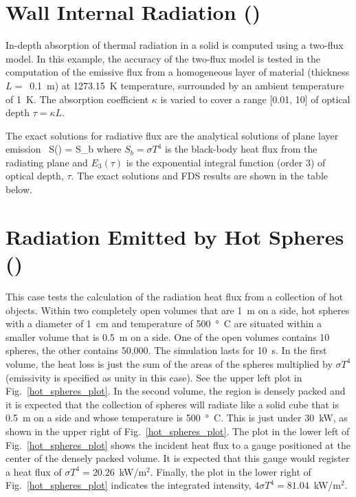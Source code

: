 \documentclass[11pt]{book}
\begin{document}


\section{Wall Internal Radiation (\texorpdfstring{}{wall\_internal\_radiation}) }
\label{wall_internal_radiation}

In-depth absorption of thermal radiation in a solid is computed using a two-flux model.  In this example, the accuracy of the two-flux model is tested in the computation of the emissive flux from a homogeneous layer of material (thickness $L=$~0.1~m) at 1273.15~K temperature, surrounded by an ambient temperature of 1~K. The absorption coefficient $\kappa$ is varied to cover a range [0.01, 10] of optical depth $\tau = \kappa L$.

The exact solutions for radiative flux are the analytical solutions of plane layer emission~\cite{Zeldovich:1}
\be
   S(\tau) = S_b
\ee
where $S_b = \sigma T^4$ is the black-body heat flux from the radiating plane and $E_3(\tau)$ is the exponential integral function (order 3) of optical depth, $\tau$. The exact solutions and FDS results are shown in the table below.




\section{Radiation Emitted by Hot Spheres (\texorpdfstring{}{hot\_spheres}) }
\label{hot_spheres}

This case tests the calculation of the radiation heat flux from a collection of hot objects. Within two completely open volumes that are 1~m on a side, hot spheres with a diameter of 1~cm and temperature of 500~\si{\degree C} are situated within a smaller volume that is 0.5~m on a side. One of the open volumes contains 10 spheres, the other contains 50,000. The simulation lasts for 10~s. In the first volume, the heat loss is just the sum of the areas of the spheres multiplied by $\sigma T^4$ (emissivity is specified as unity in this case). See the upper left plot in Fig.~\ref{hot_spheres_plot}. In the second volume, the region is densely packed and it is expected that the collection of spheres will radiate like a solid cube  that is 0.5~m on a side and whose temperature is 500~\si{\degree C}. This is just under 30~kW, as shown in the upper right of Fig.~\ref{hot_spheres_plot}. The plot in the lower left of Fig.~\ref{hot_spheres_plot} shows the incident heat flux to a gauge positioned at the center of the densely packed volume.  It is expected that this gauge would register a heat flux of $\sigma T^4=20.26$~kW/m$^2$. Finally, the plot in the lower right of Fig.~\ref{hot_spheres_plot} indicates the integrated intensity, $4 \sigma T^4=81.04$~kW/m$^2$.
\end{document}
